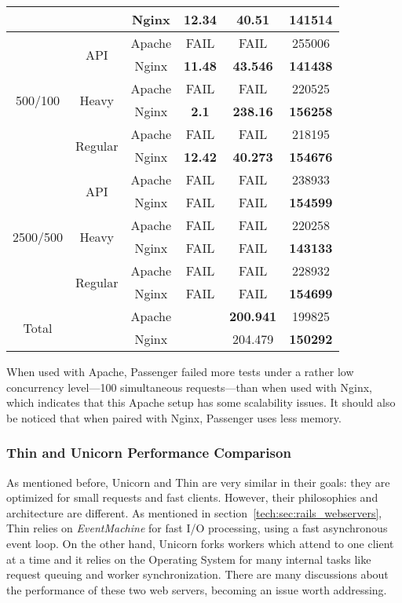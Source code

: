 \begin{table}[h!t]
\begin{tabular}{c|c|c|c|c|c}
     &  & Nginx & 12.34 & 40.51 & \textbf{141514}\\\hline
    \multirow{6}{*}{500/100} & \multirow{2}{*}{API} & Apache & FAIL & FAIL & 255006\\\cline{3-6}
     &  & Nginx & \textbf{11.48} & \textbf{43.546} & \textbf{141438}\\\cline{2-6}
     & \multirow{2}{*}{Heavy} & Apache & FAIL & FAIL & 220525\\\cline{3-6}
     &  & Nginx & \textbf{2.1} & \textbf{238.16} & \textbf{156258}\\\cline{2-6}
     & \multirow{2}{*}{Regular} & Apache & FAIL & FAIL & 218195\\\cline{3-6}
     &  & Nginx & \textbf{12.42} & \textbf{40.273} & \textbf{154676}\\\hline
    \multirow{6}{*}{2500/500} & \multirow{2}{*}{API} & Apache & FAIL & FAIL & 238933\\\cline{3-6}
     &  & Nginx & FAIL & FAIL & \textbf{154599}\\\cline{2-6}
     & \multirow{2}{*}{Heavy} & Apache & FAIL & FAIL & 220258\\\cline{3-6}
     &  & Nginx & FAIL & FAIL & \textbf{143133}\\\cline{2-6}
     & \multirow{2}{*}{Regular} & Apache & FAIL & FAIL & 228932\\\cline{3-6}
     &  & Nginx & FAIL & FAIL & \textbf{154699}\\\hline
    \multirow{2}{*}{Total} &  & Apache &  & \textbf{200.941} & 199825\\\cline{2-6}
     &  & Nginx &  & 204.479 & \textbf{150292}\\
  \end{tabular}
\end{table}

When used with Apache, Passenger failed more tests under a rather low concurrency level---100 simultaneous requests---than when used with Nginx, which indicates that this Apache setup has some scalability issues. It should also be noticed that when paired with Nginx, Passenger uses less memory. 

\subsubsection{Thin and Unicorn Performance Comparison}
As mentioned before, Unicorn and Thin are very similar in their goals: they are optimized for small requests and fast clients. However, their philosophies and architecture are different. As mentioned in section~\ref{tech:sec:rails_webservers}, Thin relies on \textit{EventMachine} for fast I/O processing, using a fast asynchronous event loop. On the other hand, Unicorn forks workers which attend to one client at a time and it relies on the Operating System for many internal tasks like request queuing and worker synchronization. There are many discussions about the performance of these two web servers, becoming an issue worth addressing.

